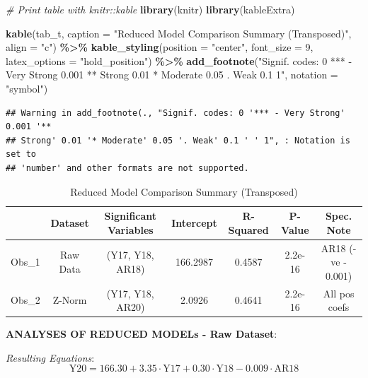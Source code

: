 \documentclass[
]{article}
\newenvironment{Shaded}{\begin{snugshade}}{\end{snugshade}}
\newcommand{\AttributeTok}[1]{\textcolor[rgb]{0.13,0.29,0.53}{#1}}
\newcommand{\CommentTok}[1]{\textcolor[rgb]{0.56,0.35,0.01}{\textit{#1}}}
\newcommand{\DecValTok}[1]{\textcolor[rgb]{0.00,0.00,0.81}{#1}}
\newcommand{\FunctionTok}[1]{\textcolor[rgb]{0.13,0.29,0.53}{\textbf{#1}}}
\newcommand{\NormalTok}[1]{#1}
\newcommand{\SpecialCharTok}[1]{\textcolor[rgb]{0.81,0.36,0.00}{\textbf{#1}}}
\newcommand{\StringTok}[1]{\textcolor[rgb]{0.31,0.60,0.02}{#1}}
\begin{document}
\begin{Shaded}
\begin{Highlighting}[]
\CommentTok{\# Print table with knitr::kable}
\FunctionTok{library}\NormalTok{(knitr)}
\FunctionTok{library}\NormalTok{(kableExtra)}

\FunctionTok{kable}\NormalTok{(tab\_t, }
      \AttributeTok{caption =} \StringTok{"Reduced Model Comparison Summary (Transposed)"}\NormalTok{,}
      \AttributeTok{align =} \StringTok{"c"}\NormalTok{) }\SpecialCharTok{\%\textgreater{}\%}
  \FunctionTok{kable\_styling}\NormalTok{(}\AttributeTok{position =} \StringTok{"center"}\NormalTok{, }\AttributeTok{font\_size =} \DecValTok{9}\NormalTok{, }\AttributeTok{latex\_options =} \StringTok{"hold\_position"}\NormalTok{) }\SpecialCharTok{\%\textgreater{}\%}
  \FunctionTok{add\_footnote}\NormalTok{(}\StringTok{"Signif. codes: 0 \textquotesingle{}*** {-} Very Strong\textquotesingle{} 0.001 \textquotesingle{}** Strong\textquotesingle{} 0.01 \textquotesingle{}* Moderate\textquotesingle{} 0.05 \textquotesingle{}. Weak\textquotesingle{} 0.1 \textquotesingle{} \textquotesingle{} 1"}\NormalTok{,}
               \AttributeTok{notation =} \StringTok{"symbol"}\NormalTok{)}
\end{Highlighting}
\end{Shaded}

\begin{verbatim}
## Warning in add_footnote(., "Signif. codes: 0 '*** - Very Strong' 0.001 '**
## Strong' 0.01 '* Moderate' 0.05 '. Weak' 0.1 ' ' 1", : Notation is set to
## 'number' and other formats are not supported.
\end{verbatim}

\begingroup\fontsize{9}{11}\selectfont

\begin{longtable}[t]{lcccccc}
\caption{\label{tab:unnamed-chunk-16}Reduced Model Comparison Summary (Transposed)}\\
\toprule
 & Dataset & Significant Variables & Intercept & R-Squared & P-Value & Spec. Note\\
\midrule
Obs\_1 & Raw Data & (Y17, Y18, AR18) & 166.2987 & 0.4587 & 2.2e-16 & AR18 (-ve - 0.001)\\
Obs\_2 & Z-Norm & (Y17, Y18, AR20) & 2.0926 & 0.4641 & 2.2e-16 & All pos coefs\\
\bottomrule
\end{longtable}
\endgroup{}

\textbf{ANALYSES OF REDUCED MODELs - Raw Dataset}:

\emph{Resulting Equations}: \[
\text{Y20} = 166.30 + 3.35 \cdot \text{Y17} + 0.30 \cdot \text{Y18} - 0.009 \cdot \text{AR18}
\]
\end{document}
